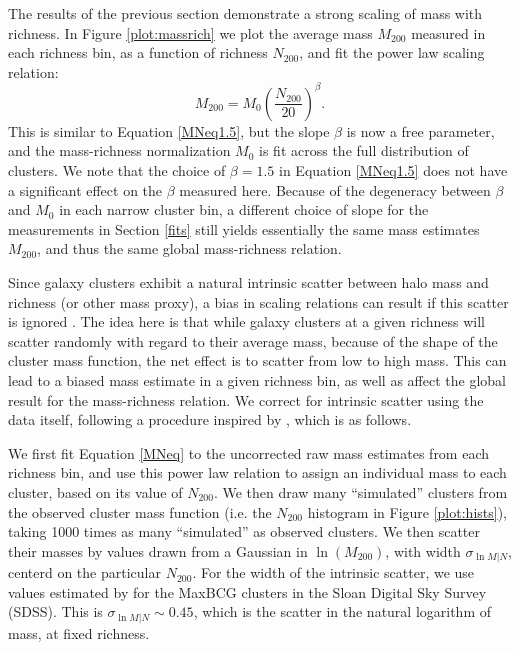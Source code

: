 \label{sec:MN}
The results of the previous section demonstrate a strong scaling of mass with richness. In Figure \ref{plot:massrich} we plot the average mass $M_{200}$ measured in each richness bin, as a function of richness $N_{200}$, and fit the power law scaling relation:
\begin{equation}
\label{MNeq}
M_{200} = M_0 \left( \frac{N_{200}}{20} \right)^\beta.
\end{equation}
This is similar to Equation \ref{MNeq1.5}, but the slope $\beta$ is now a free parameter, and the mass-richness normalization $M_0$ is fit across the full distribution of clusters. We note that the choice of $\beta=1.5$ in Equation \ref{MNeq1.5} does not have a significant effect on the $\beta$ measured here. Because of the degeneracy between $\beta$ and $M_0$ in each narrow cluster bin, a different choice of slope for the measurements in Section \ref{fits} still yields essentially the same mass estimates $M_{200}$, and thus the same global mass-richness relation.

Since galaxy clusters exhibit a natural intrinsic scatter between halo mass and richness (or other mass proxy), a bias in scaling relations can result if this scatter is ignored \citep{Rozo09a}. The idea here is that while galaxy clusters at a given richness will scatter randomly with regard to their average mass, because of the shape of the cluster mass function, the net effect is to scatter from low to high mass. This can lead to a biased mass estimate in a given richness bin, as well as affect the global result for the mass-richness relation. We correct for intrinsic scatter using the data itself, following a procedure inspired by \citet{Velander14}, which is as follows.

We first fit Equation \ref{MNeq} to the uncorrected raw mass estimates from each richness bin, and use this power law relation to assign an individual mass to each cluster, based on its value of $N_{200}$. We then draw many ``simulated'' clusters from the observed cluster mass function (i.e. the $N_{200}$ histogram in Figure \ref{plot:hists}), taking 1000 times as many ``simulated'' as observed clusters. We then scatter their masses by values drawn from a Gaussian in $\ln (M_{200})$, with width $\sigma_{\ln M|N}$, centerd on the particular $N_{200}$. For the width of the intrinsic scatter, we use values estimated by \citet{Rozo09a} for the MaxBCG clusters in the Sloan Digital Sky Survey (SDSS). This is $\sigma_{\ln M|N} \sim 0.45$, which is the scatter in the natural logarithm of mass, at fixed richness.

